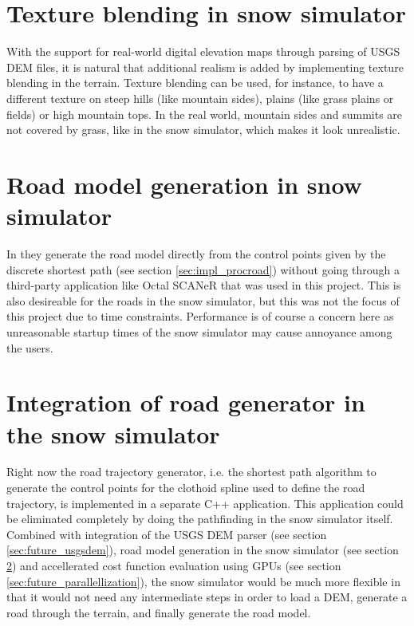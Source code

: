\section{Texture blending in snow simulator}
With the support for real-world digital elevation maps through parsing of USGS DEM files, it is natural that additional realism is added by implementing texture blending in the terrain. Texture blending can be used, for instance, to have a different texture on steep hills (like mountain sides), plains (like grass plains or fields) or high mountain tops. In the real world, mountain sides and summits are not covered by grass, like in the snow simulator, which makes it look unrealistic.

\section{Road model generation in snow simulator}
\label{sec:future_roadmodel}
In \cite{roadgen} they generate the road model directly from the control points given by the discrete shortest path (see section \ref{sec:impl_procroad}) without going through a third-party application like Octal SCANeR that was used in this project. This is also desireable for the roads in the snow simulator, but this was not the focus of this project due to time constraints. Performance is of course a concern here as unreasonable startup times of the snow simulator may cause annoyance among the users.

\section{Integration of road generator in the snow simulator}
Right now the road trajectory generator, i.e. the shortest path algorithm to generate the control points for the clothoid spline used to define the road trajectory, is implemented in a separate C++ application. This application could be eliminated completely by doing the pathfinding in the snow simulator itself. Combined with integration of the USGS DEM parser (see section \ref{sec:future_usgsdem}), road model generation in the snow simulator (see section \ref{sec:future_roadmodel}) and accellerated cost function evaluation using GPUs (see section \ref{sec:future_parallellization}), the snow simulator would be much more flexible in that it would not need any intermediate steps in order to load a DEM, generate a road through the terrain, and finally generate the road model.
